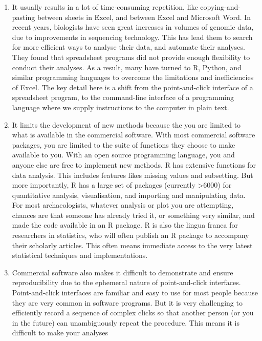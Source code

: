 \documentclass[]{book}
\begin{document}
\begin{enumerate}
\def\labelenumi{\arabic{enumi}.}
\item
  It usually results in a lot of time-consuming repetition, like
  copying-and-pasting between sheets in Excel, and between Excel and
  Microsoft Word. In recent years, biologists have seen great increases
  in volumes of genomic data, due to improvements in sequencing
  technology. This has lead them to search for more efficient ways to
  analyse their data, and automate their analyses. They found that
  spreadsheet programs did not provide enough flexibility to conduct
  their analyses. As a result, many have turned to R, Python, and
  similar programming languages to overcome the limitations and
  inefficiencies of Excel. The key detail here is a shift from the
  point-and-click interface of a spreadsheet program, to the
  command-line interface of a programming language where we supply
  instructions to the computer in plain text.
\item
  It limits the development of new methods because the you are limited
  to what is available in the commercial software. With most commercial
  software packages, you are limited to the suite of functions they
  choose to make available to you. With an open source programming
  language, you and anyone else are free to implement new methods. R has
  extensive functions for data analysis. This includes features likes
  missing values and subsetting. But more importantly, R has a large set
  of packages (currently \textgreater{}6000) for quantitative analysis,
  visualisation, and importing and manipulating data. For most
  archaeologists, whatever analysis or plot you are attempting, chances
  are that someone has already tried it, or something very similar, and
  made the code available in an R package. R is also the lingua franca
  for researchers in statistics, who will often publish an R package to
  accompany their scholarly articles. This often means immediate access
  to the very latest statistical techniques and implementations.
\item
  Commercial software also makes it difficult to demonstrate and ensure
  reproducibility due to the ephemeral nature of point-and-click
  interfaces. Point-and-click interfaces are familiar and easy to use
  for most people because they are very common in software programs. But
  it is very challenging to efficiently record a sequence of complex
  clicks so that another person (or you in the future) can unambiguously
  repeat the procedure. This means it is difficult to make your analyses

\end{enumerate}
\end{document}
